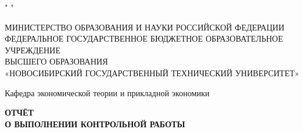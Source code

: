 \documentclass[12pt,a4paper]{article}
\begin{document}
\begin{center}

" " \vspace{30mm}

МИНИСТЕРСТВО ОБРАЗОВАНИЯ И НАУКИ РОССИЙСКОЙ ФЕДЕРАЦИИ  \\
ФЕДЕРАЛЬНОЕ ГОСУДАРСТВЕННОЕ БЮДЖЕТНОЕ ОБРАЗОВАТЕЛЬНОЕ УЧРЕЖДЕНИЕ \\
ВЫСШЕГО ОБРАЗОВАНИЯ \\
«НОВОСИБИРСКИЙ ГОСУДАРСТВЕННЫЙ ТЕХНИЧЕСКИЙ УНИВЕРСИТЕТ» \\

\vspace{16mm}


Кафедра экономической теории и прикладной экономики

\vspace{24mm}

\textbf{%
ОТЧЁТ \\
О ВЫПОЛНЕНИИ КОНТРОЛЬНОЙ РАБОТЫ \\
}

\end{center}

\vspace{12mm}
\end{document}
